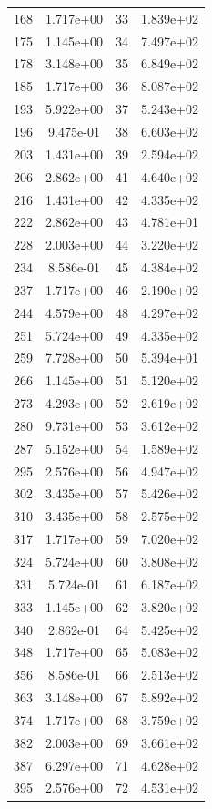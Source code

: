\documentclass[12pt]{article}
\begin{document}
\begin{longtable}{@{}cccc@{}}
168 & 1.717e+00 & 33 & 1.839e+02 \\
175 & 1.145e+00 & 34 & 7.497e+02 \\
178 & 3.148e+00 & 35 & 6.849e+02 \\
185 & 1.717e+00 & 36 & 8.087e+02 \\
193 & 5.922e+00 & 37 & 5.243e+02 \\
196 & 9.475e-01 & 38 & 6.603e+02 \\
203 & 1.431e+00 & 39 & 2.594e+02 \\
206 & 2.862e+00 & 41 & 4.640e+02 \\
216 & 1.431e+00 & 42 & 4.335e+02 \\
222 & 2.862e+00 & 43 & 4.781e+01 \\
228 & 2.003e+00 & 44 & 3.220e+02 \\
234 & 8.586e-01 & 45 & 4.384e+02 \\
237 & 1.717e+00 & 46 & 2.190e+02 \\
244 & 4.579e+00 & 48 & 4.297e+02 \\
251 & 5.724e+00 & 49 & 4.335e+02 \\
259 & 7.728e+00 & 50 & 5.394e+01 \\
266 & 1.145e+00 & 51 & 5.120e+02 \\
273 & 4.293e+00 & 52 & 2.619e+02 \\
280 & 9.731e+00 & 53 & 3.612e+02 \\
287 & 5.152e+00 & 54 & 1.589e+02 \\
295 & 2.576e+00 & 56 & 4.947e+02 \\
302 & 3.435e+00 & 57 & 5.426e+02 \\
310 & 3.435e+00 & 58 & 2.575e+02 \\
317 & 1.717e+00 & 59 & 7.020e+02 \\
324 & 5.724e+00 & 60 & 3.808e+02 \\
331 & 5.724e-01 & 61 & 6.187e+02 \\
333 & 1.145e+00 & 62 & 3.820e+02 \\
340 & 2.862e-01 & 64 & 5.425e+02 \\
348 & 1.717e+00 & 65 & 5.083e+02 \\
356 & 8.586e-01 & 66 & 2.513e+02 \\
363 & 3.148e+00 & 67 & 5.892e+02 \\
374 & 1.717e+00 & 68 & 3.759e+02 \\
382 & 2.003e+00 & 69 & 3.661e+02 \\
387 & 6.297e+00 & 71 & 4.628e+02 \\
395 & 2.576e+00 & 72 & 4.531e+02 \\

\end{longtable}
\end{document}
